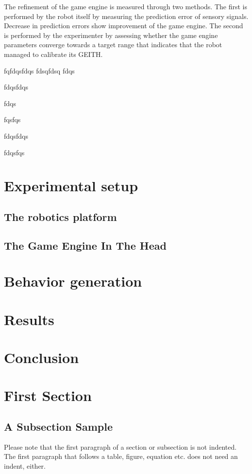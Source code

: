 \documentclass[runningheads]{llncs}
\begin{document}
The refinement of the game engine is measured through two methods. 
The first is performed by the robot itself by measuring the prediction error of sensory signals. 
Decrease in prediction errors show improvement of the game engine. 
The second is performed by the experimenter by assessing whether the game engine parameters converge towards a target range that indicates that the robot managed to calibrate its GEITH. 

fqfdqsfdqs
fdsqfdsq
fdqs

fdqsfdqs

fdqs


fqsfqs

fdqsfdqs

fdqsfqs


\section{Experimental setup}

\subsection{The robotics platform}

\subsection{The Game Engine In The Head}

\section{Behavior generation}

\section{Results}

\section{Conclusion}



\section{First Section}
\subsection{A Subsection Sample}
Please note that the first paragraph of a section or subsection is
not indented. The first paragraph that follows a table, figure,
equation etc. does not need an indent, either.
\end{document}

